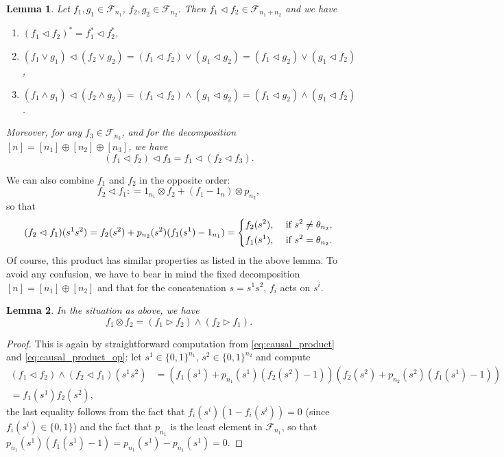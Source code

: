 \documentclass[12pt]{article}
\newtheorem{lemma}{Lemma}
\theoremstyle{definition}
\theoremstyle{remark}
\def\Fe{\mathcal F}
\def\vtl{\vartriangleleft}
\def\vtr{\vartriangleright}
\begin{document}
\begin{lemma}\label{lemma:causal_product}
Let $f_1,g_1\in \Fe_{n_1}$, $f_2,g_2\in \Fe_{n_2}$. Then $f_1\vartriangleleft f_2\in \Fe_{n_1+n_2}$ and we
have 
\begin{enumerate}
\item[(i)] $(f_1\vtl f_2)^*=f_1^*\vtl f_2^*$,
\item[(ii)]$(f_1\vee g_1)\vtl (f_2\vee g_2)=(f_1\vtl f_2)\vee ( g_1\vtl g_2)=(f_1\vtl
g_2)\vee (g_1\vtl f_2)$,
\item[(iii)] $(f_1\wedge g_1)\vtl (f_2\wedge g_2)=(f_1\vtl f_2)\wedge ( g_1\vtl g_2)=(f_1\vtl
g_2)\wedge (g_1\vtl f_2)$.
\end{enumerate}
Moreover, for any $f_3\in \Fe_{n_3}$, and for the decomposition $[n]=[n_1]\oplus
[n_2]\oplus [n_3]$, we have 
\[
(f_1\vtl f_2)\vtl f_3=f_1\vtl (f_2\vtl f_3).
\]
\end{lemma}



We can also combine $f_1$ and $f_2$ in the opposite order:
\[
f_2\vtl f_1: =1_{n_1}\otimes f_2+(f_1-1_n)\otimes p_{n_2},
\]
so that
\begin{equation}\label{eq:causal_product_op}
(f_2\vtl f_1)(s^1s^2)=f_2(s^2)+p_{n_2}(s^2)(f_1(s^1)-1_{n_1})=\begin{dcases} f_2(s^2), & \text{ if }
s^2\ne \theta_{n_2},\\
   f_1(s^1), & \text{ if } s^2=\theta_{n_2}.
   \end{dcases}
\end{equation}
Of course, this product has similar properties as listed in the above lemma.
To avoid any confusion, we have to bear in mind the fixed decomposition $[n]=[n_1]\oplus
[n_2]$ and that for the concatenation $s=s^1s^2$, $f_i$ acts on $s^i$. 

\begin{lemma}\label{lemma:causal_tensor} In the situation as above, we have
\[
f_1\otimes f_2 = (f_1\vtr f_2)\wedge (f_2\vtr f_1).
\]

\end{lemma}


\begin{proof} This is again by straightforward computation from \eqref{eq:causal_product}
and \eqref{eq:causal_product_op}: let
$s^1\in \{0,1\}^{n_1}$, $s^2\in \{0,1\}^{n_2}$ and compute
\begin{align*}
(f_1\vtl f_2)\wedge (f_2\vtl
f_1)(s^1s^2)&=\left(f_1(s^1)+p_{n_1}(s^1)(f_2(s^2)-1)\right)\left(f_2(s^2)+p_{n_2}(s^2)(f_1(s^1)-1)\right)\\
=f_1(s^1)f_2(s^2),
\end{align*}
the last equality follows from the fact that $f_i(s^i)(1-f_i(s^i))=0$ (since $f_i(s^i)\in
\{0,1\}$) and the fact that $p_{n_1}$ is the least element in $\Fe_{n_1}$, so that
$p_{n_1}(s^1)(f_1(s^1)-1)=p_{n_1}(s^1)-p_{n_1}(s^1)=0$. 

\end{proof}
\end{document}
